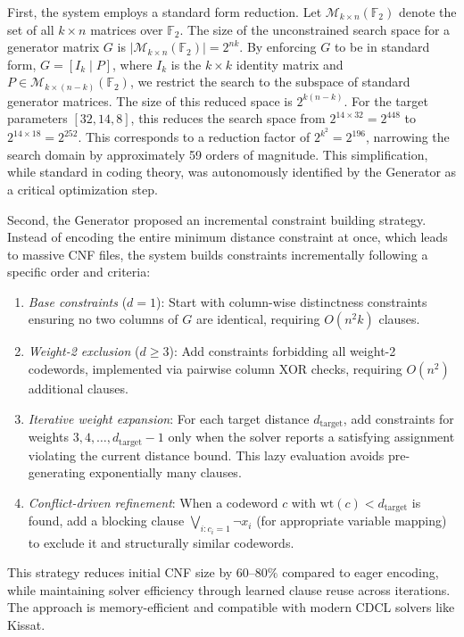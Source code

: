 First, the system employs a standard form reduction. Let $\mathcal{M}_{k \times n}(\mathbb{F}_2)$ denote the set of all $k \times n$ matrices over $\mathbb{F}_2$. The size of the unconstrained search space for a generator matrix $G$ is $|\mathcal{M}_{k \times n}(\mathbb{F}_2)| = 2^{nk}$. By enforcing $G$ to be in standard form, $G = [I_k \mid P]$, where $I_k$ is the $k \times k$ identity matrix and $P \in \mathcal{M}_{k \times (n-k)}(\mathbb{F}_2)$, we restrict the search to the subspace of standard generator matrices. The size of this reduced space is $2^{k(n-k)}$. For the target parameters $[32,14,8]$, this reduces the search space from $2^{14 \times 32} = 2^{448}$ to $2^{14 \times 18} = 2^{252}$. This corresponds to a reduction factor of $2^{k^2} = 2^{196}$, narrowing the search domain by approximately 59 orders of magnitude. This simplification, while standard in coding theory, was autonomously identified by the Generator as a critical optimization step.

Second, the Generator proposed an incremental constraint building strategy. Instead of encoding the entire minimum distance constraint at once, which leads to massive CNF files, the system builds constraints incrementally following a specific order and criteria:
\begin{enumerate}
\item \textit{Base constraints} ($d=1$): Start with column-wise distinctness constraints ensuring no two columns of $G$ are identical, requiring $O(n^2 k)$ clauses.
\item \textit{Weight-2 exclusion} ($d \geq 3$): Add constraints forbidding all weight-2 codewords, implemented via pairwise column XOR checks, requiring $O(n^2)$ additional clauses.
\item \textit{Iterative weight expansion}: For each target distance $d_{\text{target}}$, add constraints for weights $3, 4, \ldots, d_{\text{target}}-1$ only when the solver reports a satisfying assignment violating the current distance bound. This lazy evaluation avoids pre-generating exponentially many clauses.
\item \textit{Conflict-driven refinement}: When a codeword $c$ with $\text{wt}(c) < d_{\text{target}}$ is found, add a blocking clause $\bigvee_{i: c_i = 1} \neg x_i$ (for appropriate variable mapping) to exclude it and structurally similar codewords.
\end{enumerate}
This strategy reduces initial CNF size by $60$--$80\%$ compared to eager encoding, while maintaining solver efficiency through learned clause reuse across iterations. The approach is memory-efficient and compatible with modern CDCL solvers like Kissat.

